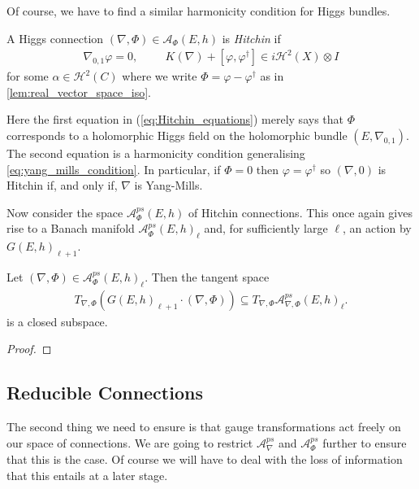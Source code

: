 \documentclass[12pt]{ociamthesis}  %
\begin{document}
Of course, we have to find a similar harmonicity condition for
Higgs bundles.

\begin{definition}
  A Higgs connection $(\nabla,\Phi)\in \mathcal A_\Phi(E,h)$
  is \emph{Hitchin} if
  \begin{align}\label{eq:Hitchin_equations}
    \nabla_{0,1}\varphi = 0,\hspace{1cm}
    K(\nabla) + [\varphi,\varphi^\dagger] \in i\mathcal H^2(X)\otimes I
  \end{align}
  for some $\alpha\in\mathcal H^2(C)$ where we write
  $\Phi = \varphi - \varphi^\dagger$ as in \ref{lem:real_vector_space_iso}.
\end{definition}

Here the first equation in (\ref{eq:Hitchin_equations}) merely says that $\Phi$
corresponds to a holomorphic Higgs field on the holomorphic bundle
$(E,\nabla_{0,1})$.  The second equation is a harmonicity condition generalising
\ref{eq:yang_mills_condition}. In particular, if $\Phi = 0$ then $\varphi =
  \varphi^\dagger$ so $(\nabla,0)$ is Hitchin if, and only if, $\nabla$ is
Yang-Mills.

Now consider the space $\mathcal A_\Phi^{ps}(E,h)$ of Hitchin connections.
This once again gives rise to a Banach manifold $\mathcal A_\Phi^{ps}(E,h)_\ell$
and, for sufficiently large $\ell$, an action by $G(E,h)_{\ell+1}$.

\begin{lemma}
  Let $(\nabla,\Phi)\in\mathcal A_\Phi^{ps}(E,h)_\ell$. Then the tangent space
  \begin{align*}
    T_{\nabla,\Phi}(G(E,h)_{\ell+1}\cdot(\nabla,\Phi))
    \subseteq T_{\nabla,\Phi}\mathcal A_{\nabla,\Phi}^{ps}(E,h)_\ell.
  \end{align*}
  is a closed subspace.
  \begin{proof}
    \missingproof
  \end{proof}
\end{lemma}

\subsection{Reducible Connections}

The second thing we need to ensure is that gauge transformations act freely on
our space of connections. We are going to restrict $\mathcal A^{ps}_\nabla$ and
$\mathcal A^{ps}_\Phi$ further to ensure that this is the case. Of course we will have
to deal with the loss of information that this entails at a later stage.
\end{document}
